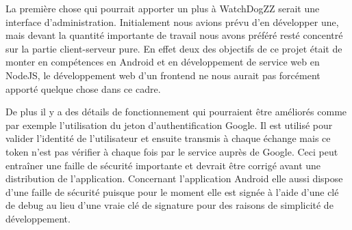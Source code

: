 La première chose qui pourrait apporter un plus à WatchDogZZ serait une interface d’administration. Initialement nous avions prévu d’en développer une, mais devant la quantité importante de travail nous avons préféré resté concentré sur la partie client-serveur pure. En effet deux des objectifs de ce projet était de monter en compétences en Android et en développement de service web en NodeJS, le développement web d’un frontend ne nous aurait pas forcément apporté quelque chose dans ce cadre.

De plus il y a des détails de fonctionnement qui pourraient être améliorés comme par exemple l’utilisation du jeton d’authentification Google. Il est utilisé pour valider l’identité de l’utilisateur et ensuite transmis à chaque échange mais ce token n’est pas vérifier à chaque fois par le service auprès de Google. Ceci peut entraîner une faille de sécurité importante et devrait être corrigé avant une distribution de l’application. Concernant l’application Android elle aussi dispose d’une faille de sécurité puisque pour le moment elle est signée à l’aide d’une clé de debug au lieu d’une vraie clé de signature pour des raisons de simplicité de développement.

